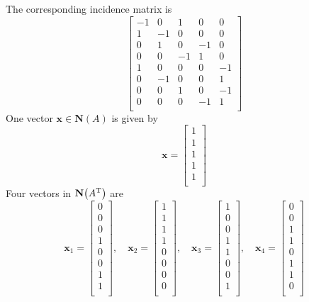 \documentclass[a4paper]{article}
\begin{document}
The corresponding incidence matrix is
\[
	\begin{bmatrix}
		-1 & 0 & 1 & 0 & 0 \\
		1 & -1 & 0 & 0 & 0 \\
		0 & 1 & 0 & -1 & 0 \\
		0 & 0 & -1 & 1 & 0 \\
		1 & 0 & 0 & 0 & -1 \\
		0 & -1 & 0 & 0 & 1 \\
		0 & 0 & 1 & 0 & -1 \\
		0 & 0 & 0 & -1 & 1 \\
	\end{bmatrix}
\]
One vector \(\bm{x} \in \textbf{N}\!\left( A \right) \) is given by
\[
	\bm{x} = 
	\begin{bmatrix}
		1 \\
		1 \\
		1 \\
		1 \\
		1 \\
	\end{bmatrix}
\]
Four vectors in \(\textbf{N}\!\left( A^{\textsc{T}} \right) \) are
\[
	\bm{x}_{1} =
	\begin{bmatrix}
		0 \\
		0 \\
		0 \\
		1 \\
		0 \\
		0 \\
		1 \\
		1 \\
	\end{bmatrix},
	\quad
	\bm{x}_{2} =
	\begin{bmatrix}
		1 \\
		1 \\
		1 \\
		1 \\
		0 \\
		0 \\
		0 \\
		0 \\
	\end{bmatrix},
	\quad
	\bm{x}_{3} =
	\begin{bmatrix}
		1 \\
		0 \\
		0 \\
		1 \\
		1 \\
		0 \\
		0 \\
		1 \\
	\end{bmatrix},
	\quad
	\bm{x}_{4} =
	\begin{bmatrix}
		0 \\
		0 \\
		1 \\
		1 \\
		0 \\
		1 \\
		1 \\
		0 \\
	\end{bmatrix}
\]
\end{document}
